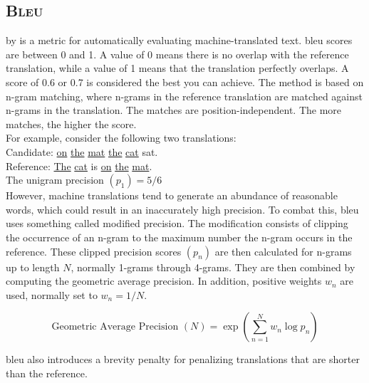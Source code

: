 \subsection{\textsc{Bleu}}
\label{sec:blue-score}
 by \textcite{papineni2002bleu} is a metric for automatically evaluating machine-translated text. \acrshort{bleu} scores are between 0 and 1. A value of 0 means there is no overlap with the reference translation, while a value of 1 means that the translation perfectly overlaps. A score of 0.6 or 0.7 is considered the best you can achieve. The method is based on n-gram matching, where n-grams in the reference translation are matched against n-grams in the translation. The matches are position-independent. The more matches, the higher the score.\\

\noindent For example, consider the following two translations:\\

\indent Candidate: \underline{on} \underline{the} \underline{mat} \underline{the} \underline{cat} sat.\\
\indent Reference: \underline{The} \underline{cat} is \underline{on} \underline{the} \underline{mat}.\\

\noindent The unigram precision \(\left(p_1\right) = 5/6\)\\

\noindent However, machine translations tend to generate an abundance of reasonable words, which could result in an inaccurately high precision. To combat this, \acrshort{bleu} uses something called modified precision. The modification consists of clipping the occurrence of an n-gram to the maximum number the n-gram occurs in the reference. These clipped precision scores \(\left(p_n\right)\) are then calculated for n-grams up to length \(N\), normally 1-grams through 4-grams. They are then combined by computing the geometric average precision. In addition, positive weights \(w_n\) are used, normally set to \(w_n = 1/N\).

\begin{equation}
    \label{eq:geometric-average-precision}
    \text{Geometric Average Precision $\left(N\right)$} = \exp \left( \sum_{n=1}^{N} w_n \log{p_n} \right)
\end{equation}

\noindent \acrshort{bleu} also introduces a brevity penalty for penalizing translations that are shorter than the reference.

